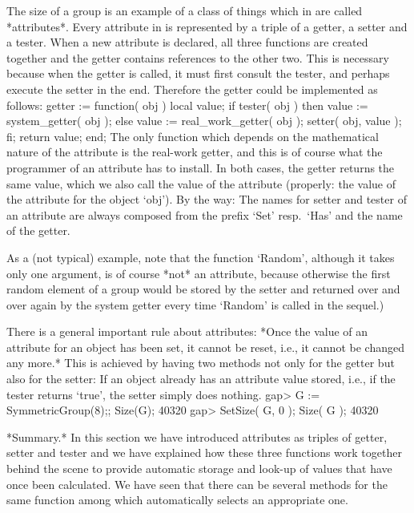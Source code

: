 The size of a group is an example of a class of things  which in {\GAP}
are called *attributes*.
Every attribute in  {\GAP} is represented by  a triple  of a getter,  a
setter   and a  tester.  When a  new  attribute  is  declared, all  three
functions are created together and  the getter contains references to the
other two.  This is necessary because when  the getter is called, it must
first  consult the tester,   and perhaps execute the  setter  in the end.
Therefore the getter could be implemented as follows:
\begintt
getter := function( obj )
local   value;
    if tester( obj )  then
        value := system_getter( obj );
    else
        value := real_work_getter( obj );
        setter( obj, value );
    fi;
    return value;
end;
\endtt
The  only  function which  depends on   the  mathematical  nature  of the
attribute  is  the  real-work getter,  and this   is  of course  what the
programmer of  an  attribute has to  install.  In both cases,  the getter
returns  the same value, which  we also call  the  value of the attribute
(properly: the value of the attribute for the object `obj').
By the way:
The names for setter and tester of an attribute are always composed from
the prefix `Set' resp.~`Has' and the name of the getter.

As a (not typical) example, note that the {\GAP} function `Random',
although it takes only one argument, is of course *not* an attribute,
because otherwise the first random element of a group would be stored by
the setter and returned over and over again by the system getter
every time `Random' is called in the sequel.)

There is a general important rule about attributes: *Once the value of an
attribute for an object has been set, it cannot be reset, i.e., it cannot
be changed any more.* This is achieved by having two methods not only for
the getter but also for the setter: If an object already has an attribute
value stored, i.e., if the tester  returns `true', the setter simply does
nothing.
\beginexample
gap> G := SymmetricGroup(8);; Size(G);
40320
gap> SetSize( G, 0 ); Size( G );
40320
\endexample

%

*Summary.* In this section  we have introduced attributes as triples
of getter, setter   and tester and    we have explained how  these  three
functions work together behind  the  scene to provide automatic  storage
and look-up of  values that have once been  calculated. We have seen that
there can be several methods for  the   same function  among which {\GAP}
automatically selects an appropriate one.

